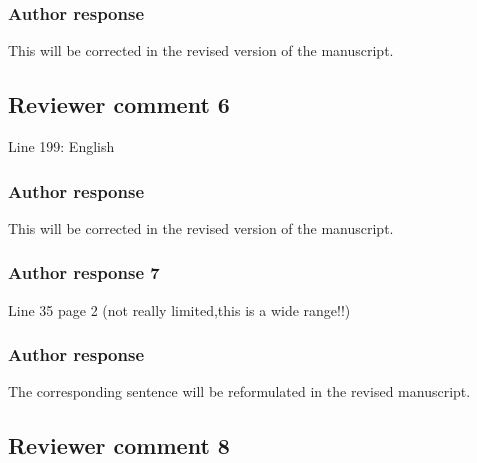 \documentclass[11pt]{scrartcl}
\begin{document}
\subsubsection*{Author response}

This will be corrected in the revised version of the manuscript.

\subsection*{Reviewer comment 6}

Line 199: English

\subsubsection*{Author response}


This will be corrected in the revised version of the manuscript.

%


\subsubsection*{Author response 7}
Line 35 page 2 (not really limited,this is a wide range!!)

\subsubsection*{Author response}

The corresponding sentence will be reformulated in the revised manuscript.


\subsection*{Reviewer comment 8}
\end{document}
